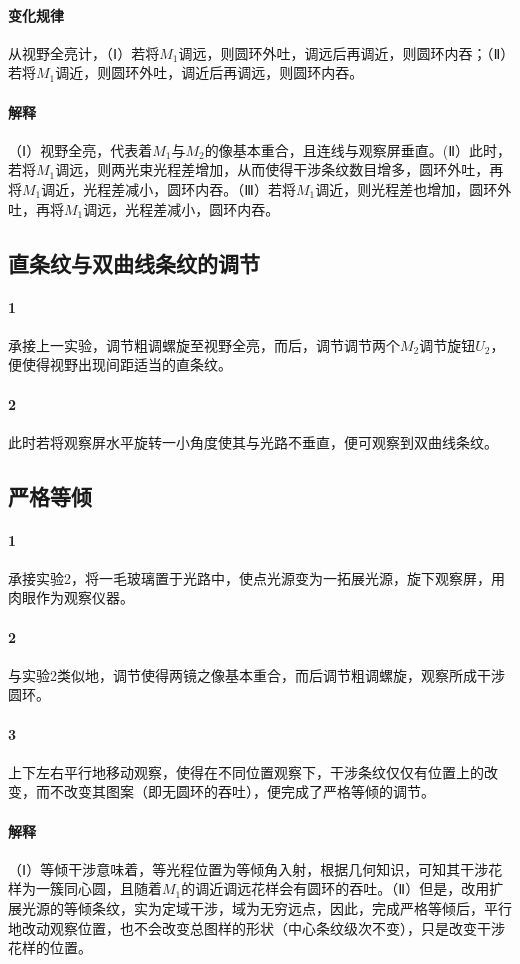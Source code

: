\documentclass{ctexart}
\begin{document}
      \paragraph{变化规律}从视野全亮计，（Ⅰ）若将$M_1$调远，则圆环外吐，调远后再调近，则圆环内吞；（Ⅱ）若将$M_1$调近，则圆环外吐，调近后再调远，则圆环内吞。
      \paragraph{解释}（Ⅰ）视野全亮，代表着$M_1$与$M_2$的像基本重合，且连线与观察屏垂直。(Ⅱ）此时，若将$M_1$调远，则两光束光程差增加，从而使得干涉条纹数目增多，圆环外吐，再将$M_1$调近，光程差减小，圆环内吞。（Ⅲ）若将$M_1$调近，则光程差也增加，圆环外吐，再将$M_1$调远，光程差减小，圆环内吞。
      \subsection{直条纹与双曲线条纹的调节}
      \paragraph{1}承接上一实验，调节粗调螺旋至视野全亮，而后，调节调节两个$M_2$调节旋钮$U_2$，便使得视野出现间距适当的直条纹。
      \paragraph{2}此时若将观察屏水平旋转一小角度使其与光路不垂直，便可观察到双曲线条纹。
      \subsection{严格等倾}
      \paragraph{1}承接实验2，将一毛玻璃置于光路中，使点光源变为一拓展光源，旋下观察屏，用肉眼作为观察仪器。
      \paragraph{2}与实验2类似地，调节使得两镜之像基本重合，而后调节粗调螺旋，观察所成干涉圆环。
      \paragraph{3}上下左右平行地移动观察，使得在不同位置观察下，干涉条纹仅仅有位置上的改变，而不改变其图案（即无圆环的吞吐），便完成了严格等倾的调节。
      \paragraph{解释}（Ⅰ）等倾干涉意味着，等光程位置为等倾角入射，根据几何知识，可知其干涉花样为一簇同心圆，且随着$M_1$的调近调远花样会有圆环的吞吐。（Ⅱ）但是，改用扩展光源的等倾条纹，实为定域干涉，域为无穷远点，因此，完成严格等倾后，平行地改动观察位置，也不会改变总图样的形状（中心条纹级次不变），只是改变干涉花样的位置。
\end{document}

